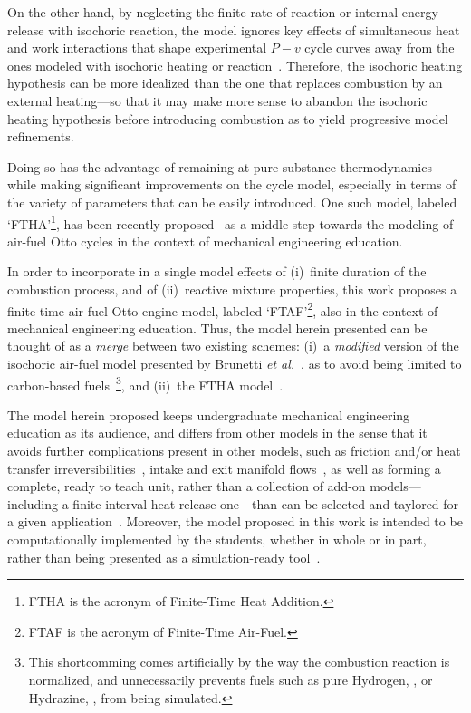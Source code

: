     On the other hand, by neglecting the finite rate of reaction or internal energy release with isochoric reaction,  the  model
    ignores key effects of simultaneous heat and work interactions that shape experimental $P-v$ cycle curves away from the ones
    modeled with isochoric heating or reaction~\cite{2013-MartinsJJG-Publindustria}. Therefore, the isochoric heating hypothesis
    can be more idealized than the one that replaces combustion by an external heating---so that  it  may  make  more  sense  to
    abandon the isochoric heating hypothesis before introducing combustion as to yield progressive model refinements.

    Doing so has the advantage of remaining at pure-substance thermodynamics while making significant improvements on the  cycle
    model, especially in terms  of  the  variety  of  parameters  that  can  be  easily  introduced.  One  such  model,  labeled
    `FTHA'\footnote{FTHA    is     the     acronym     of     Finite-Time     Heat     Addition.},     has     been     recently
    proposed~\cite{2017-NaaktgeborenC-IntJMechEngEduc} as a middle step towards the modeling of  air-fuel  Otto  cycles  in  the
    context of mechanical engineering education.

    In order to incorporate in a single model effects of (i)~finite duration of the combustion  process,  and  of  (ii)~reactive
    mixture properties, this work proposes a finite-time air-fuel Otto engine model, labeled `FTAF'\footnote{FTAF is the acronym
    of Finite-Time Air-Fuel.}, also in the context of mechanical engineering education. Thus, the model herein presented can  be
    thought of as a \emph{merge} between two existing schemes: (i)~a \emph{modified} version of  the  isochoric  air-fuel  model
    presented  by  Brunetti  \emph{et  al.\/}~\cite{2012-BrunettiF-Blucher},  as  to  avoid  being   limited   to   carbon-based
    fuels~\footnote{This shortcomming comes artificially by the way the combustion reaction  is  normalized,  and  unnecessarily
    prevents fuels such as pure  Hydrogen,  ,  or  Hydrazine,  ,  from  being  simulated.},  and  (ii)~the  FTHA
    model~\cite{2017-NaaktgeborenC-IntJMechEngEduc}.

    The model herein proposed keeps undergraduate mechanical engineering education as  its  audience,  and  differs  from  other
    models in the sense that it avoids further complications present in other models, such  as  friction  and/or  heat  transfer
    irreversibilities~\cite{2008-CurtoRissoPL+HernandezAC-JApplPhys, 2002-CatonJA-IntJMechEngEduc},  intake  and  exit  manifold
    flows~\cite{2001-CatonJA-IntJMechEngEduc}, as well as forming a complete, ready to teach unit, rather than a  collection  of
    add-on  models---including  a  finite  interval  heat  release  one---than  can  be  selected  and  taylored  for  a   given
    application~\cite{2013-MartinsJJG-Publindustria}.  Moreover,  the  model  proposed  in  this  work   is   intended   to   be
    computationally implemented by the students, whether in whole or in part, rather than being presented as a  simulation-ready
    tool~\cite{2011-ZuecoJ-IntJMechEngEduc}.


